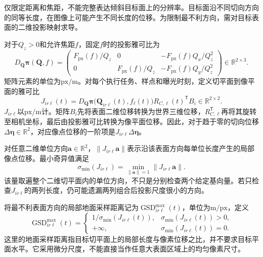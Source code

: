仅限定距离和焦距，不能完整表达倾斜目标面上的分辨率。目标面沿不同切向方向的同等长度，在图像上可能产生不同长度的位移。为限制最不利方向，需对目标表面的二维投影映射求导。

对于$Q_z>0$和允许焦距$f$，固定$f$时的投影雅可比为
\begin{equation}
 D_{\mathbf Q}\boldsymbol\pi(\mathbf Q,f)
 =\begin{pmatrix}
 F_{\mathrm{px}}(f)/Q_z&0&-F_{\mathrm{px}}(f)Q_x/Q_z^2\\
 0&F_{\mathrm{px}}(f)/Q_z&-F_{\mathrm{px}}(f)Q_y/Q_z^2
 \end{pmatrix}
 \in\mathbb R^{2\times3}.
 \label{s0405:projection_jacobian}
\end{equation}
矩阵元素的单位为$\mathrm{px/m}$。对每个执行任务、样点和曝光时刻，定义切平面到像平面的雅可比
\begin{equation}
 J_{ir\ell}(t)
 =D_{\mathbf Q}\boldsymbol\pi
   \bigl(\mathbf Q_{ir\ell}(t),f_\ell(t)\bigr)
 R_{C,\ell}(t)^{\mathsf T}B_i
 \in\mathbb R^{2\times2}.
 \label{s0405:surface_jacobian}
\end{equation}
$J_{ir\ell}$以$\mathrm{px/m}$计。矩阵$B_i$先将表面二维位移转换为世界三维位移，$R_{C,\ell}^{\mathsf T}$再将其旋转至相机坐标，最后由投影雅可比转换为像平面位移。因此，对于趋于零的切向位移$\Delta\boldsymbol\eta\in\mathbb R^2$，对应像点位移的一阶项是$J_{ir\ell}\Delta\boldsymbol\eta$。

对任意二维单位方向$\mathbf a\in\mathbb R^2$，$\|J_{ir\ell}\mathbf a\|$表示沿该表面方向每单位长度产生的局部像点位移。最小奇异值满足
\begin{equation}
 \sigma_{\min}(J_{ir\ell})
 =\min_{\|\mathbf a\|=1}\|J_{ir\ell}\mathbf a\|.
 \label{s0405:minimum_scale}
\end{equation}
该量取遍整个二维切平面内的单位方向，不只是分别检查两个给定基向量。若只检查$J_{ir\ell}$的两列长度，仍可能遗漏两列组合后投影尺度很小的方向。

将最不利表面方向的局部地面采样距离记为$\operatorname{GSD}^{\max}_{ir\ell}(t)$，单位为$\mathrm{m/px}$，定义
\begin{equation}
 \operatorname{GSD}^{\max}_{ir\ell}(t)
 =\begin{cases}
 1/\sigma_{\min}(J_{ir\ell}(t)),
 &\sigma_{\min}(J_{ir\ell}(t))>0,\\
 +\infty,&\sigma_{\min}(J_{ir\ell}(t))=0.
 \end{cases}
 \label{s0405:worst_gsd}
\end{equation}
这里的地面采样距离指目标切平面上的局部长度与像素位移之比，并不要求目标平面水平。它采用微分尺度，不能直接当作任意大表面区域上的均匀像素尺寸。

